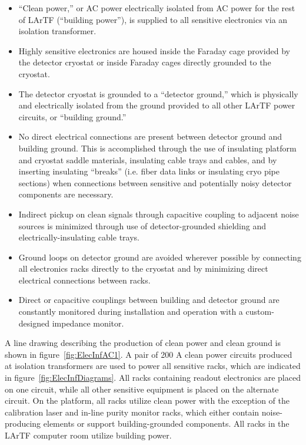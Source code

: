 \begin{itemize}
\item{``Clean power,'' or AC power electrically isolated from AC power for the rest of LArTF (``building power''), is supplied to all sensitive electronics via an isolation transformer.}
\item{Highly sensitive electronics are housed inside the Faraday cage provided by the detector cryostat or inside Faraday cages directly grounded to the cryostat.}
\item{The detector cryostat is grounded to a ``detector ground,'' which is physically and electrically isolated from the ground provided to all other LArTF power circuits, or ``building ground.''}
\item{No direct electrical connections are present between detector ground and building ground.  This is accomplished through the use of insulating platform and cryostat saddle materials, insulating cable trays and cables, and by inserting insulating ``breaks'' (i.e. fiber data links or insulating cryo pipe sections) when connections between sensitive and potentially noisy detector components are necessary.}
\item{Indirect pickup on clean signals through capacitive coupling to adjacent noise sources is minimized through use of detector-grounded shielding and electrically-insulating cable trays.}
\item{Ground loops on detector ground are avoided wherever possible by connecting all electronics racks directly to the cryostat and by minimizing direct electrical connections between racks.}
\item{Direct or capacitive couplings between building and detector ground are constantly monitored during installation and operation with a custom-designed impedance monitor.}
\end{itemize}

A line drawing describing the production of clean power and clean ground is shown in figure~\ref{fig:ElecInfAC1}.  A pair of 200 A clean power circuits produced at isolation transformers are used to power all sensitive racks, which are indicated in figure~\ref{fig:ElecInfDiagrams}.  All racks containing \lartpc readout electronics are placed on one circuit, while all other sensitive equipment is placed on the alternate circuit.  On the platform, all racks utilize clean power with the exception of the calibration laser and in-line purity monitor racks, which either contain noise-producing elements or support building-grounded components.  All racks in the LArTF computer room utilize building power.

